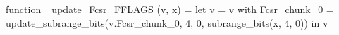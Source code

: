 function _update_Fcsr_FFLAGS (v, x) = let v = { v with Fcsr_chunk_0 = update_subrange_bits(v.Fcsr_chunk_0, 4, 0, subrange_bits(x, 4, 0)) } in
  v
